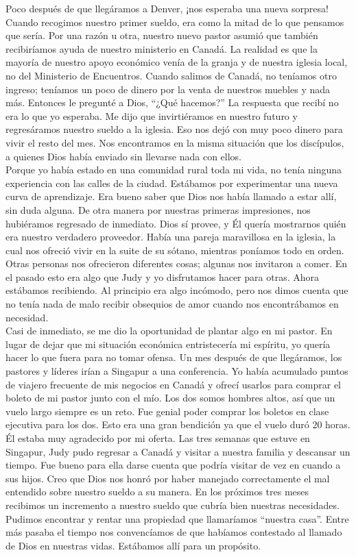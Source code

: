 \documentclass[twoside, 12pt]{book}
\begin{document}
Poco después de que llegáramos a Denver, ¡nos esperaba una nueva sorpresa! Cuando recogimos nuestro primer sueldo, era como la mitad de lo que pensamos que sería. Por una razón u otra, nuestro nuevo pastor asumió que también recibiríamos ayuda de nuestro ministerio en Canadá. La realidad es que la mayoría de nuestro apoyo económico venía de la granja y de nuestra iglesia local, no del Ministerio de Encuentros. Cuando salimos de Canadá, no teníamos otro ingreso; teníamos un poco de dinero por la venta de nuestros muebles y nada más. Entonces le pregunté a Dios, “¿Qué hacemos?” La respuesta que recibí no era lo que yo esperaba. Me dijo que invirtiéramos en nuestro futuro y regresáramos nuestro sueldo a la iglesia. Eso nos dejó con muy poco dinero para vivir el resto del mes. Nos encontramos en la misma situación que los discípulos, a quienes Dios había enviado sin llevarse nada con ellos.\\

Porque yo había estado en una comunidad rural toda mi vida, no tenía ninguna experiencia con las calles de la ciudad. Estábamos por experimentar una nueva curva de aprendizaje. Era bueno saber que Dios nos había llamado a estar allí, sin duda alguna. De otra manera por nuestras primeras impresiones, nos hubiéramos regresado de inmediato. Dios sí provee, y Él quería mostrarnos quién era nuestro verdadero proveedor. Había una pareja maravillosa en la iglesia, la cual nos ofreció vivir en la suite de su sótano, mientras poníamos todo en orden. Otras personas nos ofrecieron diferentes cosas; algunas nos invitaron a comer. En el pasado esto era algo que Judy y yo disfrutamos hacer para otras. Ahora estábamos recibiendo. Al principio era algo incómodo, pero nos dimos cuenta que no tenía nada de malo recibir obsequios de amor cuando nos encontrábamos en necesidad.\\

Casi de inmediato, se me dio la oportunidad de plantar algo en mi pastor. En lugar de dejar que mi situación económica entristecería mi espíritu, yo quería hacer lo que fuera para no tomar ofensa. Un mes después de que llegáramos, los pastores y líderes irían a Singapur a una conferencia. Yo había acumulado puntos de viajero frecuente de mis negocios en Canadá y ofrecí usarlos para comprar el boleto de mi pastor junto con el mío. Los dos somos hombres altos, así que un vuelo largo siempre es un reto. Fue genial poder comprar los boletos en clase ejecutiva para los dos. Esto era una gran bendición ya que el vuelo duró 20 horas. Él estaba muy agradecido por mi oferta. Las tres semanas que estuve en Singapur, Judy pudo regresar a Canadá y visitar a nuestra familia y descansar un tiempo. Fue bueno para ella darse cuenta que podría visitar de vez en cuando a sus hijos. Creo que Dios nos honró por haber manejado correctamente el mal entendido sobre nuestro sueldo a su manera. En los próximos tres meses recibimos un incremento a nuestro sueldo que cubría bien nuestras necesidades. Pudimos encontrar y rentar una propiedad que llamaríamos “nuestra casa”. Entre más pasaba el tiempo nos convencíamos de que habíamos contestado al llamado de Dios en nuestras vidas. Estábamos allí para un propósito.\\
\end{document}
